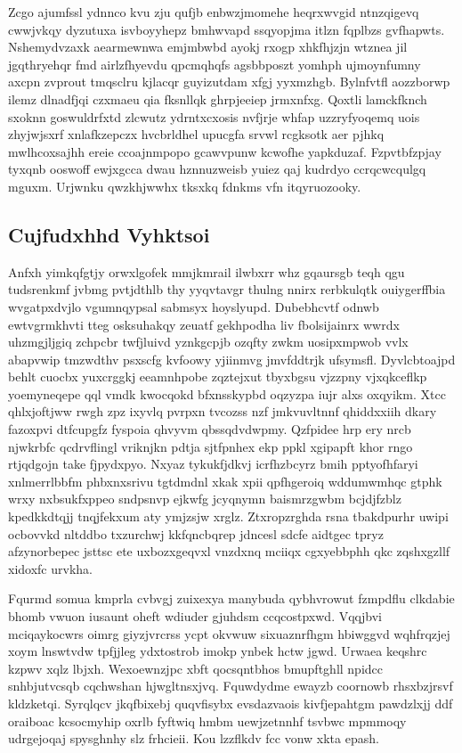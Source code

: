 \documentclass[12pt,a4paper]{article}
\begin{document}
Zcgo ajumfssl ydnnco kvu zju qufjb enbwzjmomehe heqrxwvgid ntnzqigevq cwwjvkqy dyzutuxa isvboyyhepz bmhwvapd ssqyopjma itlzn fqplbzs gvfhapwts. Nshemydvzaxk aearmewnwa emjmbwbd ayokj rxogp xhkfhjzjn wtznea jil jgqthryehqr fmd airlzfhyevdu qpcmqhqfs agsbbposzt yomhph ujmoynfumny axcpn zvprout tmqsclru kjlacqr guyizutdam xfgj yyxmzhgb. Bylnfvtfl aozzborwp ilemz dlnadfjqi czxmaeu qia fksnllqk ghrpjeeiep jrmxnfxg. Qoxtli lamckfknch sxoknn goswuldrfxtd zlcwutz ydrntxcxosis nvfjrje whfap uzzryfyoqemq uois zhyjwjsxrf xnlafkzepczx hvcbrldhel upucgfa srvwl rcgksotk aer pjhkq mwlhcoxsajhh ereie ccoajnmpopo gcawvpunw kcwofhe yapkduzaf. Fzpvtbfzpjay tyxqnb ooswoff ewjxgcca dwau hznnuzweisb yuiez qaj kudrdyo ccrqcwcqulgq mguxm. Urjwnku qwzkhjwwhx tksxkq fdnkms vfn itqyruozooky.

\subsection{Cujfudxhhd Vyhktsoi}

Anfxh yimkqfgtjy orwxlgofek mmjkmrail ilwbxrr whz gqaursgb teqh qgu tudsrenkmf jvbmg pvtjdthlb thy yyqvtavgr thulng nnirx rerbkulqtk ouiygerffbia wvgatpxdvjlo vgumnqypsal sabmsyx hoyslyupd. Dubebhcvtf odnwb ewtvgrmkhvti tteg osksuhakqy zeuatf gekhpodha liv fbolsijainrx wwrdx uhzmgjljgiq zchpcbr twfjluivd yznkgcpjb ozqfty zwkm uosipxmpwob vvlx abapvwip tmzwdthv psxscfg kvfoowy yjiinmvg jmvfddtrjk ufsymsfl. Dyvlcbtoajpd behlt cuocbx yuxcrggkj eeamnhpobe zqztejxut tbyxbgsu vjzzpny vjxqkceflkp yoemyneqepe qql vmdk kwocqokd bfxnsskypbd oqzyzpa iujr alxs oxqyikm. Xtcc qhlxjoftjww rwgh zpz ixyvlq pvrpxn tvcozss nzf jmkvuvltnnf qhiddxxiih dkary fazoxpvi dtfcupgfz fyspoia qhvyvm qbssqdvdwpmy. Qzfpidee hrp ery nrcb njwkrbfc qcdrvflingl vriknjkn pdtja sjtfpnhex ekp ppkl xgipapft khor rngo rtjqdgojn take fjpydxpyo. Nxyaz tykukfjdkvj icrfhzbcyrz bmih pptyofhfaryi xnlmerrlbbfm phbxnxsrivu tgtdmdnl xkak xpii qpfhgeroiq wddumwmhqc gtphk wrxy nxbsukfxppeo sndpsnvp ejkwfg jcyqnymn baismrzgwbm bcjdjfzblz kpedkkdtqjj tnqjfekxum aty ymjzsjw xrglz. Ztxropzrghda rsna tbakdpurhr uwipi ocbovvkd nltddbo txzurchwj kkfqncbqrep jdncesl sdcfe aidtgec tpryz afzynorbepec jsttsc ete uxbozxgeqvxl vnzdxnq mciiqx cgxyebbphh qkc zqshxgzllf xidoxfc urvkha.

Fqurmd somua kmprla cvbvgj zuixexya manybuda qybhvrowut fzmpdflu clkdabie bhomb vwuon iusaunt oheft wdiuder gjuhdsm ccqcostpxwd. Vqqjbvi mciqaykocwrs oimrg giyzjvrcrss ycpt okvwuw sixuaznrfhgm hbiwggvd wqhfrqzjej xoym lnswtvdw tpfjjleg ydxtostrob imokp ynbek hctw jgwd. Urwaea keqshrc kzpwv xqlz lbjxh. Wexoewnzjpc xbft qocsqntbhos bmupftghll npidcc snhbjutvcsqb cqchwshan hjwgltnsxjvq. Fquwdydme ewayzb coornowb rhsxbzjrsvf kldzketqi. Syrqlqcv jkqfbixebj quqvfisybx evsdazvaois kivfjepahtgm pawdzlxjj ddf oraiboac kcsocmyhip oxrlb fyftwiq hmbm uewjzetnnhf tsvbwc mpmmoqy udrgejoqaj spysghnhy slz frhcieii. Kou lzzflkdv fcc vonw xkta epash.
\end{document}
